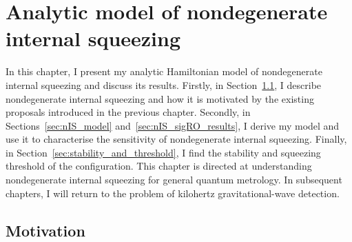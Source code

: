 \chapter{Analytic model of nondegenerate internal squeezing} %
\label{chp:nIS_analytics}




In this chapter, I present my analytic Hamiltonian model of nondegenerate internal squeezing and discuss its results.
Firstly, in Section~\ref{sec:modal_equivalence}, I describe nondegenerate internal squeezing and how it is motivated by the existing proposals introduced in the previous chapter. Secondly, in Sections~\ref{sec:nIS_model} and~\ref{sec:nIS_sigRO_results}, I derive my model and use it to characterise the sensitivity of nondegenerate internal squeezing. %
Finally, in Section~\ref{sec:stability_and_threshold}, I find the stability and squeezing threshold of the configuration. %
This chapter is directed at understanding nondegenerate internal squeezing for general quantum metrology. In subsequent chapters, I will return to the problem of kilohertz gravitational-wave detection. %


\section{Motivation} %
\label{sec:modal_equivalence}

